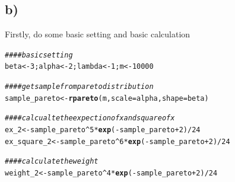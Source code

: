 \documentclass{article}\usepackage[]{graphicx}\usepackage[]{color}
\makeatletter
\newcommand{\hlnum}[1]{\textcolor[rgb]{0.686,0.059,0.569}{#1}}%
\newcommand{\hlcom}[1]{\textcolor[rgb]{0.678,0.584,0.686}{\textit{#1}}}%
\newcommand{\hlopt}[1]{\textcolor[rgb]{0,0,0}{#1}}%
\newcommand{\hlstd}[1]{\textcolor[rgb]{0.345,0.345,0.345}{#1}}%
\newcommand{\hlkwb}[1]{\textcolor[rgb]{0.69,0.353,0.396}{#1}}%
\newcommand{\hlkwc}[1]{\textcolor[rgb]{0.333,0.667,0.333}{#1}}%
\newcommand{\hlkwd}[1]{\textcolor[rgb]{0.737,0.353,0.396}{\textbf{#1}}}%
\newenvironment{kframe}{%
 \def\at@end@of@kframe{}%
 \ifinner\ifhmode%
  \def\at@end@of@kframe{\end{minipage}}%
  \begin{minipage}{\columnwidth}%
 \fi\fi%
 \def\FrameCommand##1{\hskip\@totalleftmargin \hskip-\fboxsep
 \colorbox{shadecolor}{##1}\hskip-\fboxsep
     \hskip-\linewidth \hskip-\@totalleftmargin \hskip\columnwidth}%
 \MakeFramed {\advance\hsize-\width
   \@totalleftmargin\z@ \linewidth\hsize
   \@setminipage}}%
 {\par\unskip\endMakeFramed%
 \at@end@of@kframe}
\newenvironment{knitrout}{}{} %
\makeatother
\begin{document}
\subsection{b)}
Firstly, do some basic setting and basic calculation
\begin{knitrout}
\color{fgcolor}\begin{kframe}
\begin{alltt}
\hlcom{####basic setting}
\hlstd{beta}\hlkwb{<-}\hlnum{3}\hlstd{;alpha}\hlkwb{<-}\hlnum{2}\hlstd{;lambda}\hlkwb{<-}\hlnum{1}\hlstd{;m}\hlkwb{<-}\hlnum{10000}

\hlcom{####get sample from pareto distribution}
\hlstd{sample_pareto}\hlkwb{<-}\hlkwd{rpareto}\hlstd{(m,}\hlkwc{scale}\hlstd{=alpha,}\hlkwc{shape}\hlstd{=beta)}

\hlcom{####calcualte the expection of x and square of x}
\hlstd{ex_2}\hlkwb{<-}\hlstd{sample_pareto}\hlopt{^}\hlnum{5}\hlopt{*}\hlkwd{exp}\hlstd{(}\hlopt{-}\hlstd{sample_pareto}\hlopt{+}\hlnum{2}\hlstd{)}\hlopt{/}\hlnum{24}
\hlstd{ex_square_2}\hlkwb{<-}\hlstd{sample_pareto}\hlopt{^}\hlnum{6}\hlopt{*}\hlkwd{exp}\hlstd{(}\hlopt{-}\hlstd{sample_pareto}\hlopt{+}\hlnum{2}\hlstd{)}\hlopt{/}\hlnum{24}

\hlcom{####calculate the weight}
\hlstd{weight_2}\hlkwb{<-}\hlstd{sample_pareto}\hlopt{^}\hlnum{4}\hlopt{*}\hlkwd{exp}\hlstd{(}\hlopt{-}\hlstd{sample_pareto}\hlopt{+}\hlnum{2}\hlstd{)}\hlopt{/}\hlnum{24}
\end{alltt}
\end{kframe}
\end{knitrout}
\end{document}
